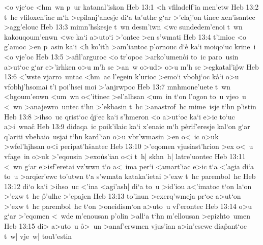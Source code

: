 <o
vje`oc
<hm~wn
p~ur
katanal'iskon\bibvsend
\vs Heb 13:1
<h
vfiladelf'ia
men'etw\bibvsend
\vs Heb 13:2
t~hc
vfiloxen'iac
m`h
>epilanj'anesje
di`a
ta'uthc
g`ar
>'elaj'on
tinec
xen'isantec
>agg'elouc\bibvsend
\vs Heb 13:3
mimn'hskesje
t~wn
desm'iwn
<wc
sundedem'enoi
t~wn
kakouqoum'enwn
<wc
ka`i
a>uto`i
>'ontec
>en
s'wmati\bibvsend
\vs Heb 13:4
t'imioc
<o
g'amoc
>en
p~asin
ka`i
<h
ko'ith
>am'iantoc
p'ornouc
d`e\r{}
ka`i
moiqo`uc
krine~i
<o
vje'oc\bibvsend
\vs Heb 13:5
>afil'arguroc
<o
tr'opoc
>arko'umen\r{o}i
to~ic
paro~usin
a>ut`oc
g`ar
e>'irhken
o>u
m'h
se
>an~w
o>ud>
o>u
m'h
se
>egkatal'i\r{p}w\bibvsend
{}
\vs Heb 13:6
<'wste
vjarro~untac
<hm~ac
l'egein
k'urioc
>emo`i
vbohj`oc
k\r{a}`i
o>u
vfobhj'hsomai
t'i
poi'hsei
moi
>'anjrwpoc\bibvsend
\vs Heb 13:7
mnhmone'uete
t~wn
<hgoum'enwn
<um~wn
o<'itinec
>el'alhsan
<um~in
t`on
l'ogon
to~u
vjeo~u
<~wn
>anajewro~untec
t`hn
>'ekbasin
t~hc
>anastrof~hc
mime~isje
t`hn
p'istin\bibvsend
\vs Heb 13:8
>ihso~uc
qrist`oc
\r{q}j`ec
ka`i
s'hmeron
<o
a>ut`oc
ka`i
e>ic
to`uc
a>i~wna\r{c}\bibvsend
{}
\vs Heb 13:9
didaqa~ic
poik'ilaic
ka`i
x'enaic
m`h
p\r{e}rif'eresje
kal`on
g`ar
q'ariti
vbebaio~usjai
t`hn
kard'ian
o>u
vbr'wmasin
>en
o<~ic
o>uk
>wfel'hjhsan
o<i
peripat'h\r{s}antec\bibvsend
{}
\vs Heb 13:10
>'eqomen
vjusiast'hrion
>ex
o<~u
vfage~in
o>uk
>'eqousin
>exo\r{u}s'ian
o<i
t~h|
skhn~h|
latre'uontec\bibvsend
\vs Heb 13:11
<~wn
g`ar
e>isf'eretai
vz'wwn
t`o
a<~ima
per`i
<amart'iac
e>ic
t`a
<'agia
di`a
to~u
>arqier'ewc
to'utwn
t`a
s'wmata
kataka'ietai
>'exw
t~hc
parembol~hc\bibvsend
\vs Heb 13:12
di`o
ka`i
>ihso~uc
<'ina
<agi'ash|
di`a
to~u
>id'iou
a<'imatoc
t`on
la`on
>'exw
t~hc
\r{p}'ulhc
>'epajen\bibvsend
\vs Heb 13:13
to'inun
>exerq'wmeja
pr`oc
a>ut`on
>'exw
t~hc
parembol~hc
t`on
>oneidism`on
a>uto~u
vf'erontec\bibvsend
\vs Heb 13:14
o>u
g`ar
>'eqomen
<~wde
m'enousan
p'olin
>all`a
t`hn
m'ellousan
>epizhto~umen\bibvsend
\vs Heb 13:15
di>
a>uto~u
\r{o}>~un
>anaf'erwmen
vjus'ian
a>in'esewc
dia\r{p}ant`oc
t~w|
vje~w|
tou\r{t}'estin
